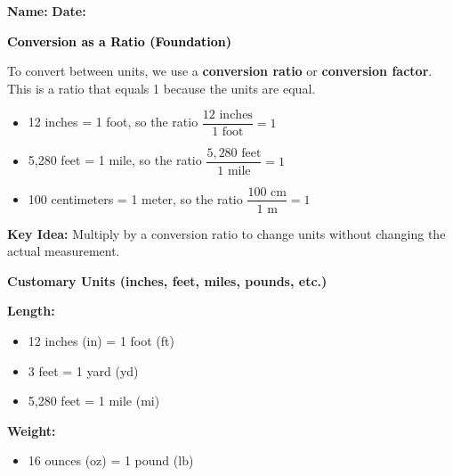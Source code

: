 \documentclass[12pt, letterpaper, fleqn]{article}
\begin{document}
\textbf{Name:} \underline{\hspace{5cm}}
\hfill
\textbf{Date:} \underline{\hspace{3cm}}\\

\begin{tcolorbox}[colback=customteal!20]
    \large\textcolor{black}{\textbf{Conversion as a Ratio (Foundation)}}
\end{tcolorbox}

\vspace{3mm}

\noindent
To convert between units, we use a \textbf{conversion ratio} or \textbf{conversion factor}. This is a ratio that equals 1 because the units are equal.

\begin{itemize}
    \item 12 inches = 1 foot, so the ratio $\dfrac{12 \text{ inches}}{1 \text{ foot}} = 1$
    \item 5,280 feet = 1 mile, so the ratio $\dfrac{5,280 \text{ feet}}{1 \text{ mile}} = 1$
    \item 100 centimeters = 1 meter, so the ratio $\dfrac{100 \text{ cm}}{1 \text{ m}} = 1$
\end{itemize}

\medskip

\noindent
\textbf{Key Idea:} Multiply by a conversion ratio to change units without changing the actual measurement.

\vspace{4mm}

\begin{tcolorbox}[colback=white, colframe=black!25, boxrule=0.6pt, arc=4mm, left=6mm, right=6mm, top=5mm, bottom=5mm]

\textbf{Customary Units (inches, feet, miles, pounds, etc.)}

\medskip

\noindent
\textbf{Length:}
\begin{itemize}
    \item 12 inches (in) = 1 foot (ft)
    \item 3 feet = 1 yard (yd)
    \item 5,280 feet = 1 mile (mi)
\end{itemize}

\noindent
\textbf{Weight:}
\begin{itemize}
    \item 16 ounces (oz) = 1 pound (lb)
\end{itemize}

\end{tcolorbox}
\end{document}
